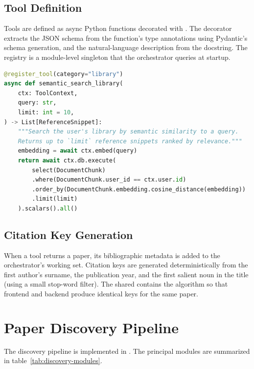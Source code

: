 \subsection{Tool Definition}

Tools are defined as async Python functions decorated with . The decorator extracts the JSON schema from the function's type annotations using Pydantic's schema generation, and the natural-language description from the docstring. The registry is a module-level singleton that the orchestrator queries at startup.

\begin{lstlisting}[caption={Representative tool definition.}, label={lst:tool-def}, language=Python]
@register_tool(category="library")
async def semantic_search_library(
    ctx: ToolContext,
    query: str,
    limit: int = 10,
) -> List[ReferenceSnippet]:
    """Search the user's library by semantic similarity to a query.
    Returns up to `limit` reference snippets ranked by relevance."""
    embedding = await ctx.embed(query)
    return await ctx.db.execute(
        select(DocumentChunk)
        .where(DocumentChunk.user_id == ctx.user.id)
        .order_by(DocumentChunk.embedding.cosine_distance(embedding))
        .limit(limit)
    ).scalars().all()
\end{lstlisting}

\subsection{Citation Key Generation}

When a tool returns a paper, its bibliographic metadata is added to the orchestrator's working set. Citation keys are generated deterministically from the first author's surname, the publication year, and the first salient noun in the title (using a small stop-word filter). The shared  contains the algorithm so that frontend and backend produce identical keys for the same paper.

\section{Paper Discovery Pipeline}
\label{sec:impl-discovery}

The discovery pipeline is implemented in . The principal modules are summarized in table~\ref{tab:discovery-modules}.

